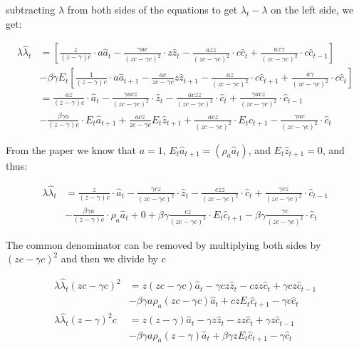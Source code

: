 \documentclass[11pt,preprint, authoryear]{elsarticle}
\numberwithin{equation}{section}
\numberwithin{figure}{section}
\numberwithin{table}{section}
\begin{document}
subtracting \(\lambda\) from both sides of the equations to get
\(\lambda_t - \lambda\) on the left side, we get:

\[\begin{aligned}
\lambda \hat{\lambda}_t &=
\left[ 
\frac{z}{(z  -\gamma)c} \cdot a \hat{a}_t 
- \frac{ \gamma a c}{(z c- \gamma c)^{2}} \cdot z \hat{z}_t 
- \frac{a z z}{(z c-\gamma c)^{2}} \cdot c \hat{c}_t
+ \frac{a z \gamma}{(z c-\gamma c)^{2}} \cdot c \hat{c}_{t-1} 
\right]\\
&  - \beta \gamma E_t
\left[
\frac{1}{(z-\gamma) c} \cdot a \hat{a}_{t+1}
- \frac{a c}{z c-\gamma c} z \hat{z}_{t+1}
- \frac{a z}{(z c-\gamma c)^{2}} \cdot c \hat{c}_{t+1}
+ \frac{a \gamma}{(z c-\gamma c)^{2}} \cdot c \hat{c}_t
\right]\\ 
&= \frac{az}{(z  -\gamma)c} \cdot  \hat{a}_t
- \frac{ \gamma a c z}{(z c- \gamma c)^{2}} \cdot \hat{z}_t 
- \frac{a c z z}{(z c-\gamma c)^{2}} \cdot \hat{c}_t
+ \frac{\gamma a c z }{(z c-\gamma c)^{2}} \cdot \hat{c}_{t-1} \\
& - \frac{\beta \gamma a}{(z-\gamma) c} \cdot E_t \hat{a}_{t+1}
+ \frac{a c z}{z c-\gamma c} E_t \hat{z}_{t+1}
+ \frac{a c z}{(z c-\gamma c)^{2}} \cdot E_t\hat{c}_{t+1}
- \frac{ \gamma a c }{(z c-\gamma c)^{2}} \cdot \hat{c}_t
\end{aligned}\]

From the paper we know that \(a=1\),
\(E_t \hat{a}_{t+1} = (\rho_a \hat{a}_t)\), and \(E_t \hat{z}_{t+1}=0\),
and thus:

\[\begin{aligned}
\lambda \hat{\lambda}_t &= 
\frac{z}{(z  -\gamma)c} \cdot  \hat{a}_t
- \frac{ \gamma c z}{(z c- \gamma c)^{2}} \cdot \hat{z}_t 
- \frac{c z z}{(z c-\gamma c)^{2}} \cdot \hat{c}_t
+ \frac{\gamma c z }{(z c-\gamma c)^{2}} \cdot \hat{c}_{t-1} 
\\
& - \frac{\beta \gamma a}{(z-\gamma) c} \cdot \rho_a \hat{a}_t
+ 0
+ \beta \gamma \frac{c z}{(z c-\gamma c)^{2}} \cdot E_t\hat{c}_{t+1}
- \beta \gamma \frac{\gamma c }{(z c-\gamma c)^{2}} \cdot \hat{c}_t
\end{aligned}\]

The common denominator can be removed by multiplying both sides by
\((zc-\gamma c)^2\) and then we divide by c

\[\begin{aligned}
\lambda \hat{\lambda}_t (zc-\gamma c)^2 &= 
z (zc-\gamma c) \hat{a}_t
- \gamma c z \hat{z}_t 
- c z z \hat{c}_t
+ \gamma c z \hat{c}_{t-1} 
\\
& - \beta \gamma a  \rho_a (zc-\gamma c) \hat{a}_t
+ c zE_t\hat{c}_{t+1}
- \gamma c \hat{c}_t\\
\lambda \hat{\lambda}_t (z-\gamma )^2c &=
z (z-\gamma ) \hat{a}_t
- \gamma z \hat{z}_t 
-  z z \hat{c}_t
+ \gamma  z \hat{c}_{t-1} \\
& - \beta \gamma a  \rho_a (z-\gamma ) \hat{a}_t
+ \beta \gamma zE_t\hat{c}_{t+1}
- \gamma \hat{c}_t
\end{aligned}\]
\end{document}

